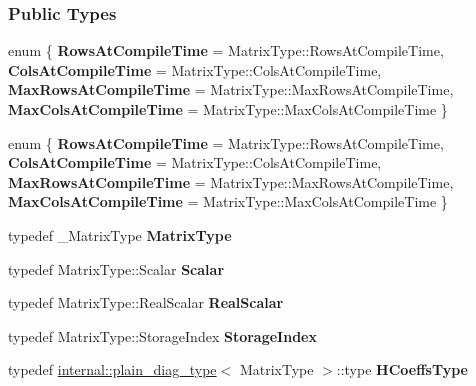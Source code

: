 \subsubsection*{Public Types}
\begin{DoxyCompactItemize}
\item 
\mbox{\label{group___q_r___module_a74b05f5921b0737d88c448f9664f70a3}} 
enum \{ {\bfseries Rows\+At\+Compile\+Time} = Matrix\+Type\+:\+:Rows\+At\+Compile\+Time, 
{\bfseries Cols\+At\+Compile\+Time} = Matrix\+Type\+:\+:Cols\+At\+Compile\+Time, 
{\bfseries Max\+Rows\+At\+Compile\+Time} = Matrix\+Type\+:\+:Max\+Rows\+At\+Compile\+Time, 
{\bfseries Max\+Cols\+At\+Compile\+Time} = Matrix\+Type\+:\+:Max\+Cols\+At\+Compile\+Time
 \}
\item 
\mbox{\label{group___q_r___module_aba91fe9f1125e7ddfef930c3d9e5f70f}} 
enum \{ {\bfseries Rows\+At\+Compile\+Time} = Matrix\+Type\+:\+:Rows\+At\+Compile\+Time, 
{\bfseries Cols\+At\+Compile\+Time} = Matrix\+Type\+:\+:Cols\+At\+Compile\+Time, 
{\bfseries Max\+Rows\+At\+Compile\+Time} = Matrix\+Type\+:\+:Max\+Rows\+At\+Compile\+Time, 
{\bfseries Max\+Cols\+At\+Compile\+Time} = Matrix\+Type\+:\+:Max\+Cols\+At\+Compile\+Time
 \}
\item 
\mbox{\label{group___q_r___module_a8276f0f98a2d82532146ae8b5967f6e9}} 
typedef \+\_\+\+Matrix\+Type {\bfseries Matrix\+Type}
\item 
\mbox{\label{group___q_r___module_a7a1da52a50e75161a8ea7b3f72934129}} 
typedef Matrix\+Type\+::\+Scalar {\bfseries Scalar}
\item 
\mbox{\label{group___q_r___module_a55487671adbf44783c3c8b109cb0a14d}} 
typedef Matrix\+Type\+::\+Real\+Scalar {\bfseries Real\+Scalar}
\item 
\mbox{\label{group___q_r___module_aa5d396f5f75b59073a6ed5c0f54bfd42}} 
typedef Matrix\+Type\+::\+Storage\+Index {\bfseries Storage\+Index}
\item 
\mbox{\label{group___q_r___module_a5773b249a76bed6f46e04b9a2c832019}} 
typedef \hyperlink{struct_eigen_1_1internal_1_1plain__diag__type}{internal\+::plain\+\_\+diag\+\_\+type}$<$ Matrix\+Type $>$\+::type {\bfseries H\+Coeffs\+Type}

\end{DoxyCompactItemize}
